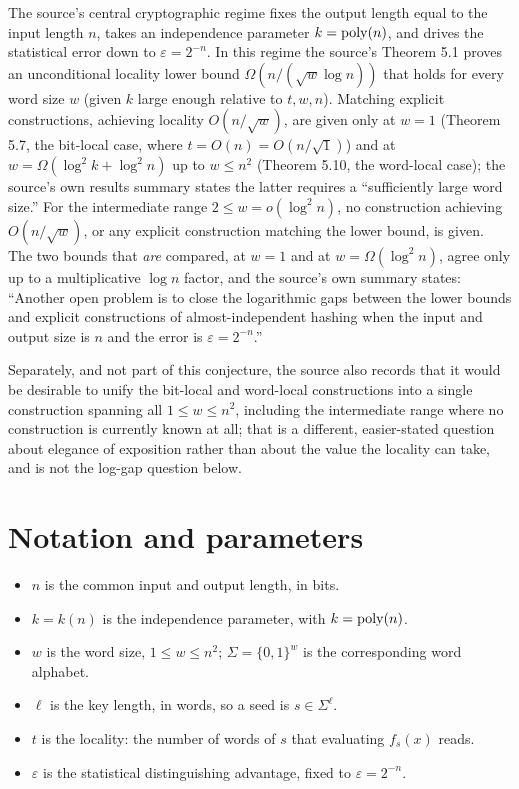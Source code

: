 \documentclass{aicr-conjecture}
\newcommand{\Om}{\Omega}
\newcommand{\eps}{\varepsilon}
\begin{document}
The source's central cryptographic regime fixes the output length
equal to the input length $n$, takes an independence parameter $k =
\mathrm{poly}(n)$, and drives the statistical error down to $\eps = 2^{-n}$.
In this regime the source's Theorem 5.1 proves an unconditional
locality lower bound $\Om(n / (\sqrt{w} \log n))$ that holds for every
word size $w$ (given $k$ large enough relative to $t, w, n$). Matching
explicit constructions, achieving locality $O(n / \sqrt{w})$, are given
only at $w = 1$ (Theorem 5.7, the bit-local case, where $t = O(n) =
O(n/\sqrt{1})$) and at $w = \Om(\log^{2}k + \log^{2}n)$ up to $w \le
n^{2}$ (Theorem 5.10, the word-local case); the source's own results
summary states the latter requires a ``sufficiently large word size.''
For the intermediate range $2 \le w = o(\log^{2}n)$, no construction
achieving $O(n/\sqrt{w})$, or any explicit construction matching the
lower bound, is given. The two bounds that \emph{are} compared, at $w =
1$ and at $w = \Om(\log^{2}n)$, agree only up to a multiplicative $\log
n$ factor, and the source's own summary states: ``Another open problem
is to close the logarithmic gaps between the lower bounds and explicit
constructions of almost-independent hashing when the input and output
size is $n$ and the error is $\eps = 2^{-n}$.''

Separately, and not part of this conjecture, the source also records
that it would be desirable to unify the bit-local and word-local
constructions into a single construction spanning all $1 \le w \le
n^{2}$, including the intermediate range where no construction is
currently known at all; that is a different, easier-stated question
about elegance of exposition rather than about the value the locality
can take, and is not the log-gap question below.

\section{Notation and parameters}\label{sec:notation}

\begin{itemize}[nosep]
  \item $n$ is the common input and output length, in bits.
  \item $k = k(n)$ is the independence parameter, with $k = \mathrm{poly}(n)$.
  \item $w$ is the word size, $1 \le w \le n^{2}$; $\Sigma = \{0,1\}^{w}$
    is the corresponding word alphabet.
  \item $\ell$ is the key length, in words, so a seed is $s \in
    \Sigma^{\ell}$.
  \item $t$ is the locality: the number of words of $s$ that evaluating
    $f_{s}(x)$ reads.
  \item $\eps$ is the statistical distinguishing advantage, fixed to
    $\eps = 2^{-n}$.
\end{itemize}
\end{document}
